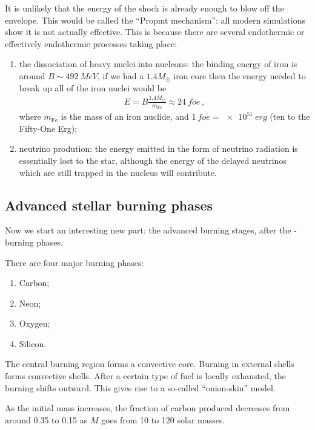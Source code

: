 \documentclass[main.tex]{subfiles}
\begin{document}

It is unlikely that the energy of the shock is already enough to blow off the envelope. This would be called the ``Propmt mechanism'': all modern simulations show it is not actually effective.
This is because there are several endothermic or effectively endothermic processes taking place: 
\begin{enumerate}
  \item the dissociation of heavy nuclei into nucleons: the binding energy of iron is around \(B \sim \SI{492}{MeV}\), if we had a \(1.4 M_{\odot}\) iron core then the energy needed to break up all of the iron nuclei would be 
  \begin{align}
  E = B \frac{1.4 M_{\odot}}{m _{\text{Fe}}} \approx \SI{24}{foe}
  \,,
  \end{align}
  where \(m _{\text{Fe}}\) is the mass of an iron nuclide, and \(\SI{1}{foe} = \SI{e51}{erg}\) (ten to the Fifty-One Erg);
  \item neutrino prodution: the energy emitted in the form of neutrino radiation is essentially lost to the star, although
  the energy of the delayed neutrinos which are still trapped in the nucleus will contribute.
\end{enumerate}

\subsection{Advanced stellar burning phases}

Now we start an interesting new part: the advanced burning stages, after the -burning phases. 

There are four major burning phases: 
%
\begin{enumerate}
    \item Carbon;
    \item Neon;
    \item Oxygen;
    \item Silicon.
\end{enumerate}

The central burning region forms a convective core.
Burning in external shells forms convective shells.
After a certain type of fuel is locally exhausted, the burning shifts outward.
This gives rise to a so-called ``onion-skin'' model.

As the initial mass increases, the fraction of carbon produced decreases from around \num{.35} to \num{.15} as \(M\) goes from 10 to 120 solar masses. 
\end{document}
